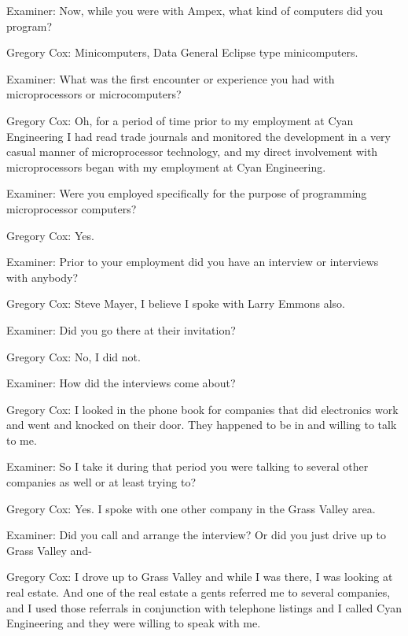 \textcolor{interviewer}{Examiner:} Now, while you were with Ampex, what kind of computers did you program?

\textcolor{interviewee}{Gregory Cox:} Minicomputers, Data General Eclipse type minicomputers. 

\textcolor{interviewer}{Examiner:} What was the first encounter or experience you had with microprocessors or microcomputers? 

\textcolor{interviewee}{Gregory Cox:} Oh, for a period of time prior to my employment at Cyan Engineering I had read trade journals and monitored the development in a very casual manner of microprocessor technology, and my direct involvement with microprocessors began with my employment at Cyan Engineering. 

\textcolor{interviewer}{Examiner:} Were you employed specifically for the purpose of programming microprocessor computers? 

\textcolor{interviewee}{Gregory Cox:} Yes. 

\textcolor{interviewer}{Examiner:} Prior to your employment did you have an interview or interviews with anybody?

\textcolor{interviewee}{Gregory Cox:} Steve Mayer, I believe I spoke with Larry Emmons also. 

\textcolor{interviewer}{Examiner:} Did you go there at their invitation? 

\textcolor{interviewee}{Gregory Cox:} No, I did not. 

\textcolor{interviewer}{Examiner:} How did the interviews come about? 

\textcolor{interviewee}{Gregory Cox:} I looked in the phone book for companies that did electronics work and went and knocked on their door. They happened to be in and willing to talk to me. 

\textcolor{interviewer}{Examiner:} So I take it during that period you were talking to several other companies as well or at least trying to? 

\textcolor{interviewee}{Gregory Cox:} Yes. I spoke with one other company in the Grass Valley area. 

\textcolor{interviewer}{Examiner:} Did you call and arrange the interview? Or did you just drive up to Grass Valley and- 

\textcolor{interviewee}{Gregory Cox:} I drove up to Grass Valley and while I was there, I was looking at real estate. And one of the real estate a gents referred me to several companies, and I used those referrals in conjunction with telephone listings and I called Cyan Engineering and they were willing to speak with me. 

